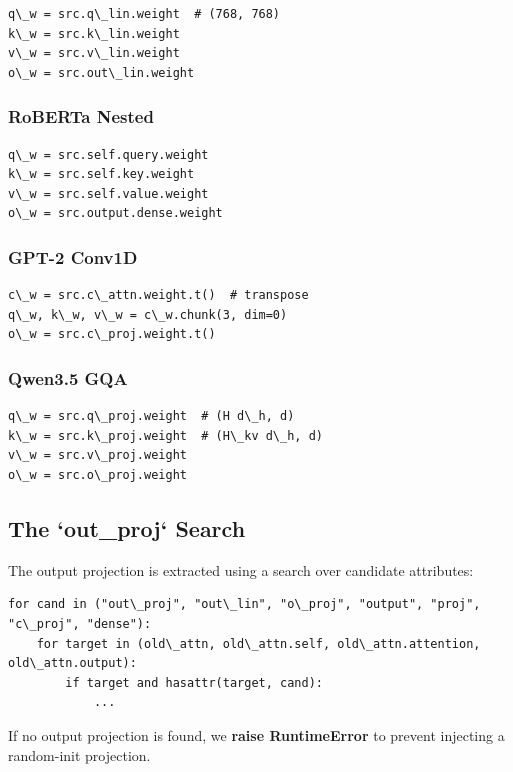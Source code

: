 \begin{lstlisting}
q\_w = src.q\_lin.weight  # (768, 768)
k\_w = src.k\_lin.weight
v\_w = src.v\_lin.weight
o\_w = src.out\_lin.weight
\end{lstlisting}

\subsubsection{RoBERTa Nested}

\begin{lstlisting}
q\_w = src.self.query.weight
k\_w = src.self.key.weight
v\_w = src.self.value.weight
o\_w = src.output.dense.weight
\end{lstlisting}

\subsubsection{GPT-2 Conv1D}

\begin{lstlisting}
c\_w = src.c\_attn.weight.t()  # transpose
q\_w, k\_w, v\_w = c\_w.chunk(3, dim=0)
o\_w = src.c\_proj.weight.t()
\end{lstlisting}

\subsubsection{Qwen3.5 GQA}

\begin{lstlisting}
q\_w = src.q\_proj.weight  # (H d\_h, d)
k\_w = src.k\_proj.weight  # (H\_kv d\_h, d)
v\_w = src.v\_proj.weight
o\_w = src.o\_proj.weight
\end{lstlisting}

\subsection{The `out\_proj` Search}

The output projection is extracted using a search over candidate attributes:

\begin{lstlisting}
for cand in ("out\_proj", "out\_lin", "o\_proj", "output", "proj", "c\_proj", "dense"):
    for target in (old\_attn, old\_attn.self, old\_attn.attention, old\_attn.output):
        if target and hasattr(target, cand):
            ...
\end{lstlisting}

If no output projection is found, we \textbf{raise RuntimeError} to prevent 
injecting a random-init projection.

